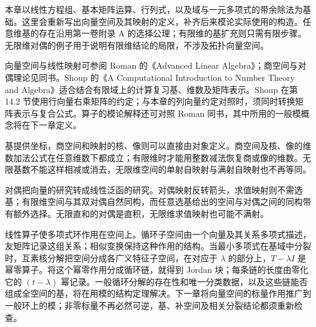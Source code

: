 \ProseParagraphBreak

本章以线性方程组、基本矩阵运算、行列式，以及域与一元多项式的带余除法为基础。这里会重新写出向量空间及其映射的定义，补齐后来模论实际使用的构造。任意维基的存在沿用第一卷附录 A 的选择公理；有限维的基扩充则只需有限步骤。无限维对偶的例子用于说明有限维结论的局限，不涉及拓扑向量空间。

\ProseParagraphBreak
向量空间与线性映射可参阅 Roman 的《Advanced Linear Algebra》\cite[Chapters 1--2]{Roman2008AdvancedLinearAlgebra}；商空间与对偶理论见同书\cite[Chapter 3, pp. 87--105]{Roman2008AdvancedLinearAlgebra}。Shoup 的《A Computational Introduction to Number Theory and Algebra》\cite[\S\S 13.4--13.5, 14.2]{Shoup2008NumberTheoryAlgebra}适合结合有限域上的计算复习基、维数及矩阵表示。Shoup 在第 14.2 节使用行向量右乘矩阵的约定；与本章的列向量约定对照时，须同时转换矩阵表示与复合公式。算子的模论解释还可对照 Roman 同书\cite[Chapter 7, The Module Associated with a Linear Operator, pp. 164--167]{Roman2008AdvancedLinearAlgebra}，其中所用的一般模概念将在下一章定义。






\begin{chaptersummary}
	基提供坐标，商空间和映射的核、像则可以直接由对象定义。商空间及核、像的维数加法公式在任意维数下都成立；有限维时才能用整数减法恢复商或像的维数。无限基数不能这样相减或消去，无限维空间的单射自映射与满射自映射也不再等同。

	\ProseParagraphBreak
	对偶把向量的研究转成线性泛函的研究。对偶映射反转箭头，求值映射则不需选基；有限维空间与其双对偶自然同构，而任意选基给出的空间与对偶之间的同构带有额外选择。无限直和的对偶是直积，无限维求值映射也可能不满射。

	\ProseParagraphBreak
	线性算子使多项式环作用在空间上。循环子空间由一个向量及其关系多项式描述，友矩阵记录这组关系；相似变换保持这种作用的结构。当最小多项式在基域中分裂时，互素核分解把空间分成各广义特征子空间，在对应于 \(\lambda\) 的部分上，\(T-\lambda I\) 是幂零算子。将这个幂零作用分成循环链，就得到 Jordan 块；每条链的长度由零化它的 \((t-\lambda)\) 幂记录。一般循环分解的存在性和唯一分类数据，以及这些链能否组成全空间的基，将在用模的结构定理解决。下一章将向量空间的标量作用推广到一般环上的模；非零标量不再必然可逆，基、补空间及相关分裂结论都须重新检查。
\end{chaptersummary}

\BookExercises


